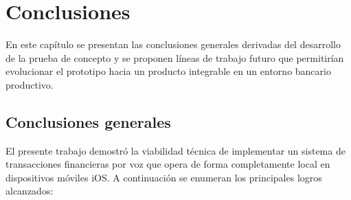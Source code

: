 
\chapter{Conclusiones} %

\label{Chapter5}

En este capítulo se presentan las conclusiones generales derivadas del desarrollo de la prueba de concepto y se proponen líneas de trabajo futuro que permitirían evolucionar el prototipo hacia un producto integrable en un entorno bancario productivo.



\section{Conclusiones generales}

El presente trabajo demostró la viabilidad técnica de implementar un sistema de transacciones financieras por voz que opera de forma completamente local en dispositivos móviles iOS. A continuación se enumeran los principales logros alcanzados:

